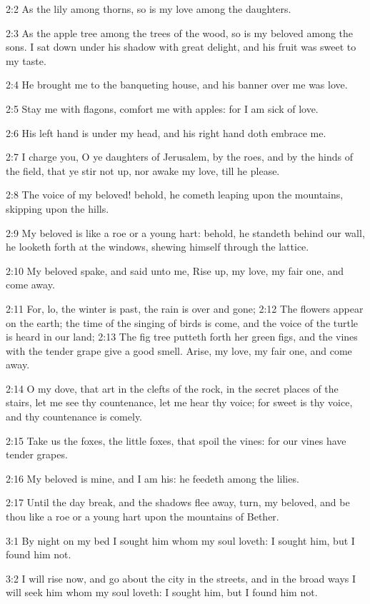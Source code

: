 2:2 As the lily among thorns, so is my love among the daughters.

2:3 As the apple tree among the trees of the wood, so is my beloved
among the sons. I sat down under his shadow with great delight, and
his fruit was sweet to my taste.

2:4 He brought me to the banqueting house, and his banner over me was
love.

2:5 Stay me with flagons, comfort me with apples: for I am sick of
love.

2:6 His left hand is under my head, and his right hand doth embrace
me.

2:7 I charge you, O ye daughters of Jerusalem, by the roes, and by the
hinds of the field, that ye stir not up, nor awake my love, till he
please.

2:8 The voice of my beloved! behold, he cometh leaping upon the
mountains, skipping upon the hills.

2:9 My beloved is like a roe or a young hart: behold, he standeth
behind our wall, he looketh forth at the windows, shewing himself
through the lattice.

2:10 My beloved spake, and said unto me, Rise up, my love, my fair
one, and come away.

2:11 For, lo, the winter is past, the rain is over and gone; 2:12 The
flowers appear on the earth; the time of the singing of birds is come,
and the voice of the turtle is heard in our land; 2:13 The fig tree
putteth forth her green figs, and the vines with the tender grape give
a good smell. Arise, my love, my fair one, and come away.

2:14 O my dove, that art in the clefts of the rock, in the secret
places of the stairs, let me see thy countenance, let me hear thy
voice; for sweet is thy voice, and thy countenance is comely.

2:15 Take us the foxes, the little foxes, that spoil the vines: for
our vines have tender grapes.

2:16 My beloved is mine, and I am his: he feedeth among the lilies.

2:17 Until the day break, and the shadows flee away, turn, my beloved,
and be thou like a roe or a young hart upon the mountains of Bether.

3:1 By night on my bed I sought him whom my soul loveth: I sought him,
but I found him not.

3:2 I will rise now, and go about the city in the streets, and in the
broad ways I will seek him whom my soul loveth: I sought him, but I
found him not.

